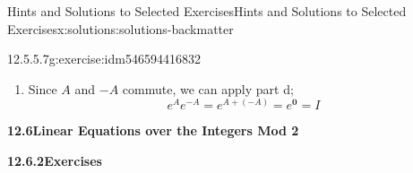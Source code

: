 \documentclass[oneside,10pt,]{book}
\newcommand{\blocktitlefont}{\relax}
\numberwithin{equation}{section}
\begin{document}
\begin{solutions-chapter}{Hints and Solutions to Selected Exercises}{}{Hints and Solutions to Selected Exercises}{}{}{x:solutions:solutions-backmatter}
\begin{divisionsolution}{12.5.5.7}{}{g:exercise:idm546594416832}
\begin{enumerate}[label=(\alph*)]
\begin{equation*}
\begin{split}
&= I + A + B+ \frac{A^2}{2}+ A B + \frac{B^2}{2}+\frac{A^3}{6}+ \frac{A^2B}{2}+\frac{A B^2}{2}+ \frac{B^3}{6}+\cdots \\
&= I + (A+B) + \frac{1}{2}\left(A^2+ 2 A B + B^2\right)+ \frac{1}{6}\left(A^3+ 3A^2B+ 3A B^2+ B^3\right)+\cdots \\
&=I + (A+B)+ \frac{1}{2}(A+B)^2+ \frac{1}{6}(A+B)^3+\cdots \\
& =e^{A+B}\\
\end{split}
\end{equation*}
%
\item{}Since \(A\) and \(-A\) commute, we can apply part d;%
\begin{equation*}
e^Ae^{-A} = e^{A+(-A)} =e^{\pmb{0}} =I
\end{equation*}
%
\end{enumerate}
%
\end{divisionsolution}%
\par\smallskip
\noindent\textbf{\Large{}12.6\space\textperiodcentered\space{}Linear Equations over the Integers Mod 2}
\par\smallskip
\par\smallskip
\noindent\textbf{\Large{}12.6.2\space\textperiodcentered\space{}Exercises}
\par\smallskip
{}%
\end{solutions-chapter}
\end{document}
